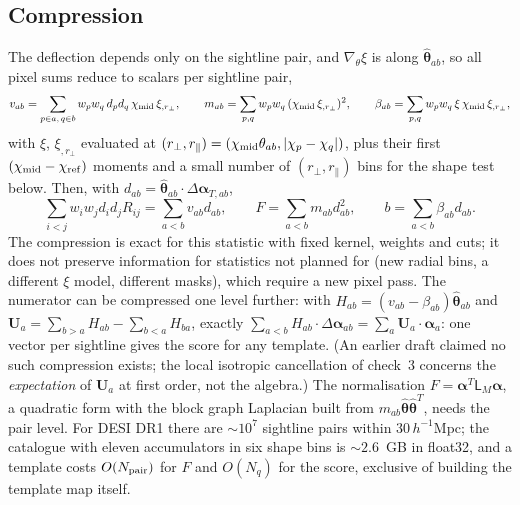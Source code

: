 \documentclass[11pt,a4paper]{article}
\newcommand{\vth}{\bm{\theta}}
\begin{document}
\subsection{Compression}
\label{sec:pair-compress}
The deflection depends only on the sightline pair, and $\nabla_\theta\xi$ is along $\hat{\vth}_{ab}$, so all pixel sums reduce to scalars per sightline pair,
\begin{equation}
v_{ab}=\sum_{p\in a,\,q\in b}w_pw_q\,d_pd_q\,\chi_{\rm mid}\,\xi_{,r_\perp},\qquad
m_{ab}=\sum_{p,q}w_pw_q\,(\chi_{\rm mid}\,\xi_{,r_\perp})^2,\qquad
\beta_{ab}=\sum_{p,q}w_pw_q\,\xi\,\chi_{\rm mid}\,\xi_{,r_\perp},
\label{eq:Vab}
\end{equation}
with $\xi$, $\xi_{,r_\perp}$ evaluated at $(r_\perp,r_\parallel)=(\chi_{\rm mid}\theta_{ab},|\chi_p-\chi_q|)$, plus their first $(\chi_{\rm mid}-\chi_{\rm ref})$ moments and a small number of $(r_\perp,r_\parallel)$ bins for the shape test below. Then, with $d_{ab}=\hat{\vth}_{ab}\cdot\Delta\bm\alpha_{T,ab}$,
\begin{equation}
\sum_{i<j}w_iw_jd_id_jR_{ij}=\sum_{a<b}v_{ab}d_{ab},\qquad
F=\sum_{a<b}m_{ab}d_{ab}^2,\qquad b=\sum_{a<b}\beta_{ab}d_{ab}.
\end{equation}
The compression is exact for this statistic with fixed kernel, weights and cuts; it does not preserve information for statistics not planned for (new radial bins, a different $\xi$ model, different masks), which require a new pixel pass. The numerator can be compressed one level further: with $H_{ab}=(v_{ab}-\beta_{ab})\hat{\vth}_{ab}$ and $\bm U_a=\sum_{b>a}H_{ab}-\sum_{b<a}H_{ba}$, exactly $\sum_{a<b}H_{ab}\cdot\Delta\bm\alpha_{ab}=\sum_a\bm U_a\cdot\bm\alpha_a$: one vector per sightline gives the score for any template. (An earlier draft claimed no such compression exists; the local isotropic cancellation of check~3 concerns the \emph{expectation} of $\bm U_a$ at first order, not the algebra.) The normalisation $F=\bm\alpha^T\mathsf L_M\bm\alpha$, a quadratic form with the block graph Laplacian built from $m_{ab}\hat{\vth}\hat{\vth}^T$, needs the pair level. For DESI DR1 there are $\sim10^7$ sightline pairs within $30\,h^{-1}$Mpc; the catalogue with eleven accumulators in six shape bins is $\sim2.6$~GB in float32, and a template costs $O(N_{\rm pair})$ for $F$ and $O(N_q)$ for the score, exclusive of building the template map itself.
\end{document}
